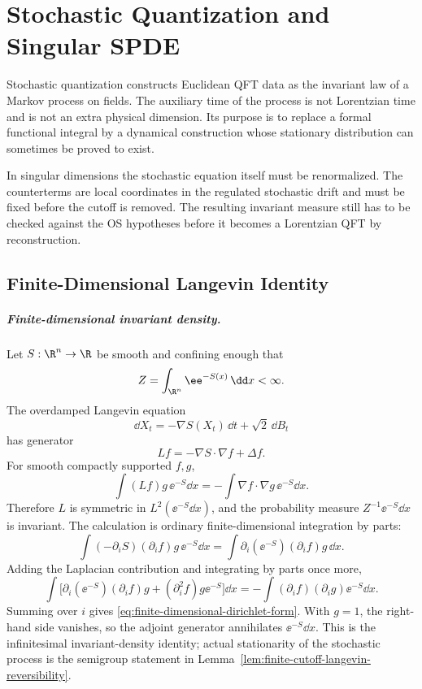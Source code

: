 \chapter{Stochastic Quantization and Singular SPDE}
\label{ch:constructive-stochastic-quantization-singular-spde}

\ConventionsEuclidean

Stochastic quantization constructs Euclidean QFT data as the invariant law of
a Markov process on fields.  The auxiliary time of the process is not
Lorentzian time and is not an extra physical dimension.  Its purpose is to
replace a formal functional integral by a dynamical construction whose
stationary distribution can sometimes be proved to exist.

In singular dimensions the stochastic equation itself must be renormalized.
The counterterms are local coordinates in the regulated stochastic drift and
must be fixed before the cutoff is removed.  The resulting invariant measure
still has to be checked against the OS hypotheses before it becomes a
Lorentzian QFT by reconstruction.

\section{Finite-Dimensional Langevin Identity}

\paragraph{Finite-dimensional invariant density.}
Let \(S:\R^n\to\R\) be smooth and confining enough that
\[
  Z=\int_{\R^n}\ee^{-S(x)}\,\dd x<\infty .
\]
The overdamped Langevin equation
\begin{equation}
  \dd X_t=-\nabla S(X_t)\,\dd t+\sqrt2\,\dd B_t
  \label{eq:finite-dimensional-langevin}
\end{equation}
has generator
\[
  Lf=-\nabla S\cdot\nabla f+\Delta f .
\]
For smooth compactly supported \(f,g\),
\begin{equation}
  \int (Lf)g\,\ee^{-S}\dd x
  =
  -\int \nabla f\cdot\nabla g\,\ee^{-S}\dd x .
  \label{eq:finite-dimensional-dirichlet-form}
\end{equation}
Therefore \(L\) is symmetric in \(L^2(\ee^{-S}\dd x)\), and the probability
measure \(Z^{-1}\ee^{-S}\dd x\) is invariant.
The calculation is ordinary finite-dimensional integration by parts:
\[
  \int (-\partial_iS)(\partial_i f)g\,\ee^{-S}\dd x
  =
  \int \partial_i(\ee^{-S})(\partial_i f)g\,\dd x .
\]
Adding the Laplacian contribution and integrating by parts once more,
\[
  \int
  \bigl[\partial_i(\ee^{-S})(\partial_i f)g
        +(\partial_i^2 f)g\ee^{-S}\bigr]\dd x
  =
  -\int (\partial_i f)(\partial_i g)\ee^{-S}\dd x .
\]
Summing over \(i\) gives \eqref{eq:finite-dimensional-dirichlet-form}.  With
\(g=1\), the right-hand side vanishes, so the adjoint generator annihilates
\(\ee^{-S}\dd x\).  This is the infinitesimal invariant-density identity;
actual stationarity of the stochastic process is the semigroup statement in
Lemma~\ref{lem:finite-cutoff-langevin-reversibility}.

